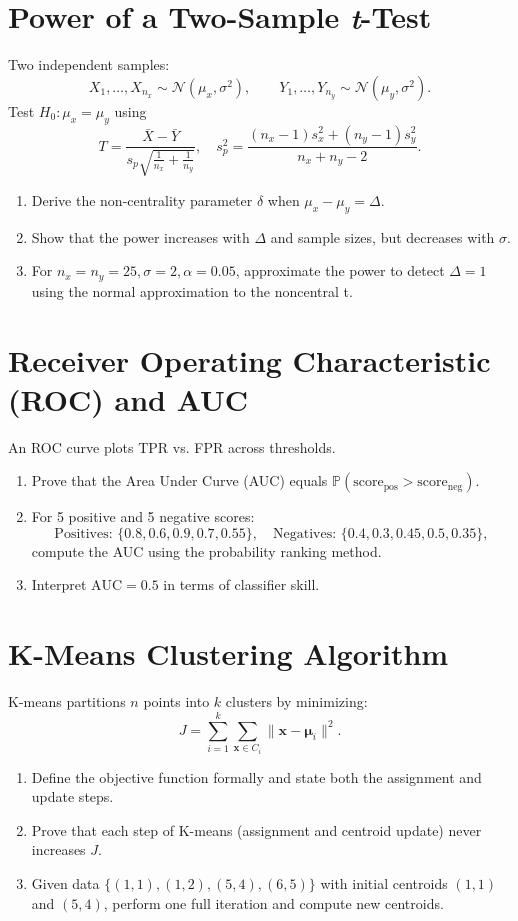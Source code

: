 \documentclass[12pt,a4paper]{article}
\begin{document}
\section{Power of a Two-Sample \textit{t}-Test}
Two independent samples:
\[
X_1,\ldots,X_{n_x}\sim\mathcal{N}(\mu_x,\sigma^2), \qquad
Y_1,\ldots,Y_{n_y}\sim\mathcal{N}(\mu_y,\sigma^2).
\]
Test \( H_0:\mu_x=\mu_y \) using
\[
T=\frac{\bar{X}-\bar{Y}}{s_p\sqrt{\tfrac{1}{n_x}+\tfrac{1}{n_y}}},\quad
s_p^2=\frac{(n_x-1)s_x^2+(n_y-1)s_y^2}{n_x+n_y-2}.
\]
\begin{enumerate}[label=(\arabic*)]
\item Derive the non-centrality parameter \( \delta \) when \( \mu_x-\mu_y=\Delta \).
\item Show that the power increases with \( \Delta \) and sample sizes, but decreases with \( \sigma \).
\item For \( n_x=n_y=25, \sigma=2, \alpha=0.05 \), approximate the power to detect \( \Delta=1 \) using the normal approximation to the noncentral t.
\end{enumerate}

\section{Receiver Operating Characteristic (ROC) and AUC}
An ROC curve plots TPR vs. FPR across thresholds.
\begin{enumerate}[label=(\arabic*)]
\item Prove that the Area Under Curve (AUC) equals \( \mathbb{P}(\text{score}_{\text{pos}} > \text{score}_{\text{neg}}) \).
\item For 5 positive and 5 negative scores:
\[
\text{Positives: } \{0.8,0.6,0.9,0.7,0.55\},\quad
\text{Negatives: } \{0.4,0.3,0.45,0.5,0.35\},
\]
compute the AUC using the probability ranking method.
\item Interpret \( \mathrm{AUC}=0.5 \) in terms of classifier skill.
\end{enumerate}

\section{K-Means Clustering Algorithm}
K-means partitions \( n \) points into \( k \) clusters by minimizing:
\[
J = \sum_{i=1}^k \sum_{\mathbf{x}\in C_i} \|\mathbf{x}-\boldsymbol{\mu}_i\|^2.
\]
\begin{enumerate}[label=(\arabic*)]
\item Define the objective function formally and state both the assignment and update steps.
\item Prove that each step of K-means (assignment and centroid update) never increases \( J \).
\item Given data \( \{(1,1),(1,2),(5,4),(6,5)\} \) with initial centroids \( (1,1) \) and \( (5,4) \), perform one full iteration and compute new centroids.
\end{enumerate}
\end{document}
